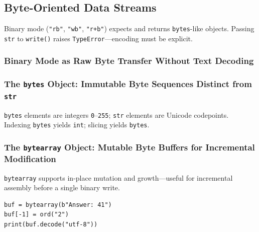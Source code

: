 \subsection{Byte-Oriented Data Streams}

Binary mode (\texttt{"rb"}, \texttt{"wb"}, \texttt{"r+b"}) expects and returns \texttt{bytes}-like objects. Passing \texttt{str} to \texttt{write()} raises \texttt{TypeError}---encoding must be explicit.

\subsubsection{Binary Mode as Raw Byte Transfer Without Text Decoding}

\subsubsection{The \texttt{bytes} Object: Immutable Byte Sequences Distinct from \texttt{str}}

\texttt{bytes} elements are integers \texttt{0}--\texttt{255}; \texttt{str} elements are Unicode codepoints. Indexing \texttt{bytes} yields \texttt{int}; slicing yields \texttt{bytes}.

\subsubsection{The \texttt{bytearray} Object: Mutable Byte Buffers for Incremental Modification}

\texttt{bytearray} supports in-place mutation and growth---useful for incremental assembly before a single binary write.

\begin{verbatim}
buf = bytearray(b"Answer: 41")
buf[-1] = ord("2")
print(buf.decode("utf-8"))
\end{verbatim}
